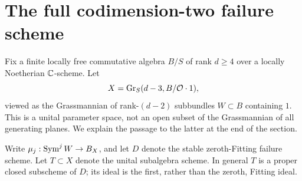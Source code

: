 \section{The full codimension-two failure scheme}
\label{sec:full-codimension-two}
Fix a finite locally free commutative algebra $B/S$ of rank $d\ge4$
over a locally Noetherian $\mathbb C$-scheme. Let
\[
 X=\operatorname{Gr}_S(d-3,B/\mathcal O\cdot1),
\]
viewed as the Grassmannian of rank-$(d-2)$ subbundles $W\subset B$
containing $1$. This is a unital parameter space, not an open subset
of the Grassmannian of all generating planes. We explain the passage
to the latter at the end of the section.

Write $\mu_j:\operatorname{Sym}^j W\to B_X$, and let $D$ denote the stable
zeroth-Fitting failure scheme. Let $T\subset X$ denote the unital
subalgebra scheme. In general $T$ is a proper closed subscheme of
$D$; its ideal is the first, rather than the zeroth, Fitting ideal.

